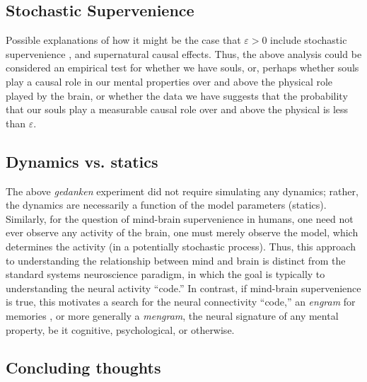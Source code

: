 \documentclass{article}
\newcommand{\eps}{\varepsilon}
\begin{document}


\subsection{Stochastic Supervenience} %
\label{par:stochastic_supervenience}


Possible explanations of how it might be the case that $\eps>0$ include stochastic supervenience \cite{Craver09}, and supernatural causal effects.  Thus, the above analysis could be considered an empirical test for whether we have souls, or, perhaps whether souls play a causal role in our mental properties over and above the physical role played by the brain, or whether the data we have suggests that the probability that our souls play a measurable causal role over and above the physical is less than $\eps$.



\subsection{Dynamics vs. statics} %
\label{par:dynamics_vs_statics}

The above \emph{gedanken} experiment did not require simulating any dynamics; rather, the dynamics are necessarily a function of the model parameters (statics).  Similarly, for the question of mind-brain supervenience in humans, one need not ever observe any activity of the brain, one must merely observe the model, which determines the activity (in a potentially stochastic process). Thus, this approach to understanding the relationship between mind and brain is distinct from the standard systems neuroscience paradigm, in which the goal is typically to understanding the neural activity ``code.''  In contrast, if mind-brain supervenience is true, this motivates a search for the neural connectivity ``code,'' an \emph{engram} for memories \cite{Semon21, Lashley50, ZhangLinden03, ShemaDudai07, BerryDavis08}, or more generally a \emph{mengram}, the neural signature of any mental property, be it cognitive, psychological, or otherwise.  


\subsection{Concluding thoughts} %
\label{par:concluding_thoughts}
\end{document}
